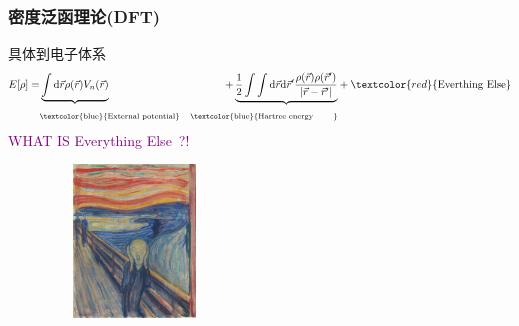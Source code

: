 {\frame
{
	\frametitle{密度泛函理论\textrm{(DFT)}}
	具体到电子体系
	\begin{displaymath}
		\begin{aligned}
			E[\rho]=&\underbrace{\int\mathrm{d}\vec r\rho(\vec r)V_n(\vec r)}&+\underbrace{\dfrac12\int\int\mathrm{d}\vec r\mathrm{d}\vec r^{\prime}\dfrac{\rho(\vec r)\rho(\vec r^{\prime})}{|\vec r-\vec r^{\prime}|}}&+\textcolor{red}{\mathrm{Everthing~Else}}\\
			&\mbox{\fontsize{7.0pt}{4.5pt}\selectfont{\textcolor{blue}{\textrm{External~potential}}}} &\mbox{\fontsize{7.0pt}{4.5pt}\selectfont{\textcolor{blue}{\textrm{Hartree~energy ~~~~~~}}}} &
		\end{aligned}
	\end{displaymath}
	\textcolor{purple}{\textrm{WHAT IS Everything Else~?!}}
\begin{figure}[h!]
\vskip -8pt
\centering
\includegraphics[height=1.60in,width=1.8in,viewport=0 0 212 275,clip]{Figures/Edvard_Munch-The-Scream.jpg}
\caption{\fontsize{6.0pt}{4.5pt}}%
\label{Edvard_Munch-The-Scream}
\end{figure}
}

}
